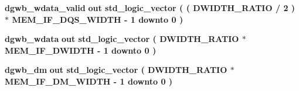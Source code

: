 \begin{DoxyCompactItemize}
\item 
{\bf dgwb\+\_\+wdata\+\_\+valid}  {\bfseries {\bfseries \textcolor{keywordflow}{out}\textcolor{vhdlchar}{ }}} {\bfseries \textcolor{comment}{std\+\_\+logic\+\_\+vector}\textcolor{vhdlchar}{ }\textcolor{vhdlchar}{(}\textcolor{vhdlchar}{ }\textcolor{vhdlchar}{(}\textcolor{vhdlchar}{ }\textcolor{vhdlchar}{ }\textcolor{vhdlchar}{ }\textcolor{vhdlchar}{ }{\bfseries {\bf D\+W\+I\+D\+T\+H\+\_\+\+R\+A\+T\+IO}} \textcolor{vhdlchar}{/}\textcolor{vhdlchar}{ } \textcolor{vhdldigit}{2} \textcolor{vhdlchar}{ }\textcolor{vhdlchar}{)}\textcolor{vhdlchar}{ }\textcolor{vhdlchar}{$\ast$}\textcolor{vhdlchar}{ }\textcolor{vhdlchar}{ }\textcolor{vhdlchar}{ }{\bfseries {\bf M\+E\+M\+\_\+\+I\+F\+\_\+\+D\+Q\+S\+\_\+\+W\+I\+D\+TH}} \textcolor{vhdlchar}{-\/}\textcolor{vhdlchar}{ } \textcolor{vhdldigit}{1} \textcolor{vhdlchar}{ }\textcolor{keywordflow}{downto}\textcolor{vhdlchar}{ }\textcolor{vhdlchar}{ } \textcolor{vhdldigit}{0} \textcolor{vhdlchar}{ }\textcolor{vhdlchar}{)}\textcolor{vhdlchar}{ }} 
\item 
{\bf dgwb\+\_\+wdata}  {\bfseries {\bfseries \textcolor{keywordflow}{out}\textcolor{vhdlchar}{ }}} {\bfseries \textcolor{comment}{std\+\_\+logic\+\_\+vector}\textcolor{vhdlchar}{ }\textcolor{vhdlchar}{(}\textcolor{vhdlchar}{ }\textcolor{vhdlchar}{ }\textcolor{vhdlchar}{ }\textcolor{vhdlchar}{ }{\bfseries {\bf D\+W\+I\+D\+T\+H\+\_\+\+R\+A\+T\+IO}} \textcolor{vhdlchar}{$\ast$}\textcolor{vhdlchar}{ }\textcolor{vhdlchar}{ }\textcolor{vhdlchar}{ }{\bfseries {\bf M\+E\+M\+\_\+\+I\+F\+\_\+\+D\+W\+I\+D\+TH}} \textcolor{vhdlchar}{-\/}\textcolor{vhdlchar}{ } \textcolor{vhdldigit}{1} \textcolor{vhdlchar}{ }\textcolor{keywordflow}{downto}\textcolor{vhdlchar}{ }\textcolor{vhdlchar}{ } \textcolor{vhdldigit}{0} \textcolor{vhdlchar}{ }\textcolor{vhdlchar}{)}\textcolor{vhdlchar}{ }} 
\item 
{\bf dgwb\+\_\+dm}  {\bfseries {\bfseries \textcolor{keywordflow}{out}\textcolor{vhdlchar}{ }}} {\bfseries \textcolor{comment}{std\+\_\+logic\+\_\+vector}\textcolor{vhdlchar}{ }\textcolor{vhdlchar}{(}\textcolor{vhdlchar}{ }\textcolor{vhdlchar}{ }\textcolor{vhdlchar}{ }\textcolor{vhdlchar}{ }{\bfseries {\bf D\+W\+I\+D\+T\+H\+\_\+\+R\+A\+T\+IO}} \textcolor{vhdlchar}{$\ast$}\textcolor{vhdlchar}{ }\textcolor{vhdlchar}{ }\textcolor{vhdlchar}{ }{\bfseries {\bf M\+E\+M\+\_\+\+I\+F\+\_\+\+D\+M\+\_\+\+W\+I\+D\+TH}} \textcolor{vhdlchar}{-\/}\textcolor{vhdlchar}{ } \textcolor{vhdldigit}{1} \textcolor{vhdlchar}{ }\textcolor{keywordflow}{downto}\textcolor{vhdlchar}{ }\textcolor{vhdlchar}{ } \textcolor{vhdldigit}{0} \textcolor{vhdlchar}{ }\textcolor{vhdlchar}{)}\textcolor{vhdlchar}{ }} 

\end{DoxyCompactItemize}
